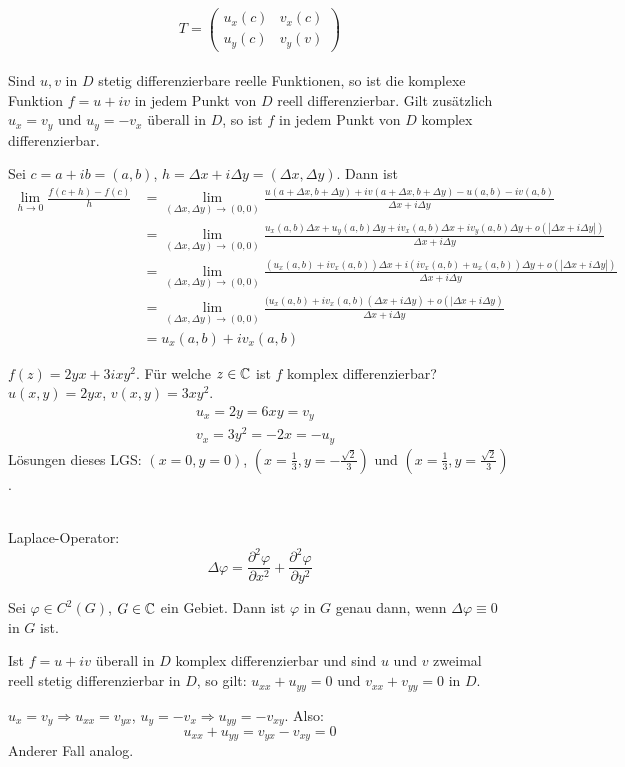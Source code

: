\[ T= \begin{pmatrix}
u_x(c)&v_x(c)\\ u_y(c)&v_y(v)
\end{pmatrix} \]
\\
Sind $ u,v $ in $ D $ stetig differenzierbare reelle Funktionen, so ist die komplexe Funktion $ f=u+iv $ in jedem Punkt von $ D $ reell differenzierbar. Gilt zus\"atzlich $ u_x=v_y $ und $ u_y=-v_x $ \"uberall in $ D $, so ist $ f $ in jedem Punkt von $ D $ komplex differenzierbar.
\begin{beweis}
	Sei $ c=a+ib=(a,b) $, $ h=\Delta x+i\Delta y=(\Delta x,\Delta y) $. Dann ist
	\begin{align*} \lim_{h\to 0}\frac{f(c+h)-f(c)}{h}&=\lim_{(\Delta x,\Delta y)\to(0,0)}\frac{u(a+\Delta x,b+\Delta y)+iv(a+\Delta x,b+\Delta y)-u(a,b)-iv(a,b)}{\Delta x+i\Delta y}\\&=\lim_{(\Delta x,\Delta y)\to(0,0)}\frac{u_x(a,b)\Delta x+u_y(a,b)\Delta y+iv_x(a,b)\Delta x+iv_y(a,b)\Delta y+o(|\Delta x+i\Delta y|)}{\Delta x+i\Delta y}\\&=\lim_{(\Delta x,\Delta y)\to(0,0)}\frac{(u_x(a,b)+iv_x(a,b))\Delta x+i(iv_x(a,b)+u_x(a,b))\Delta y+o(|\Delta x+i\Delta y|)}{\Delta x+i\Delta y}\\&=\lim_{(\Delta x,\Delta y)\to(0,0)}\frac{(u_x(a,b)+iv_x(a,b)(\Delta x+i\Delta y)+o(|\Delta x+i\Delta y)}{\Delta x+i\Delta y}\\&=u_x(a,b)+iv_x(a,b) \end{align*}
\end{beweis}
\begin{beispiel*}
	$ f(z)=2yx+3ixy^2 $. F\"ur welche $ z\in\mathbb{C} $ ist $ f $ komplex differenzierbar? $ u(x,y)=2yx $, $ v(x,y)=3xy^2 $.
	\begin{align*}
	&u_x=2y=6xy=v_y\\
	&v_x=3y^2=-2x=-u_y
	\end{align*}
	L\"osungen dieses LGS: $ (x=0,y=0) $, $ \left(x=\frac{1}{3},y=-\frac{\sqrt{2}}{3}\right)  $ und $ \left(x=\frac{1}{3}, y=\frac{\sqrt{2}}{3}\right) $.
\end{beispiel*}
\\
Laplace-Operator:
\[ \Delta\varphi=\frac{\partial^2\varphi}{\partial x^2}+\frac{\partial^2\varphi}{\partial y^2} \]
\begin{definition}
	Sei $ \varphi\in C^2(G) $, $ G\in\mathbb{C} $ ein Gebiet. Dann ist $ \varphi $  in $ G $ genau dann, wenn $ \Delta\varphi\equiv 0 $ in $ G $ ist.
\end{definition}
\begin{satz}
	Ist $ f=u+iv $ \"uberall in $ D $ komplex differenzierbar und sind $ u $ und $ v $ zweimal reell stetig differenzierbar in $ D $, so gilt: $ u_{xx}+u_{yy}=0 $ und $ v_{xx}+v_{yy}=0 $ in $ D $.
\end{satz}
\begin{beweis}
	$ u_x=v_y\Rightarrow u_{xx}=v_{yx} $, $ u_y=-v_x\Rightarrow u_{yy}=-v_{xy}$. Also:
	\[ u_{xx}+u_{yy}=v_{yx}-v_{xy}=0 \]
	Anderer Fall analog.
\end{beweis}
